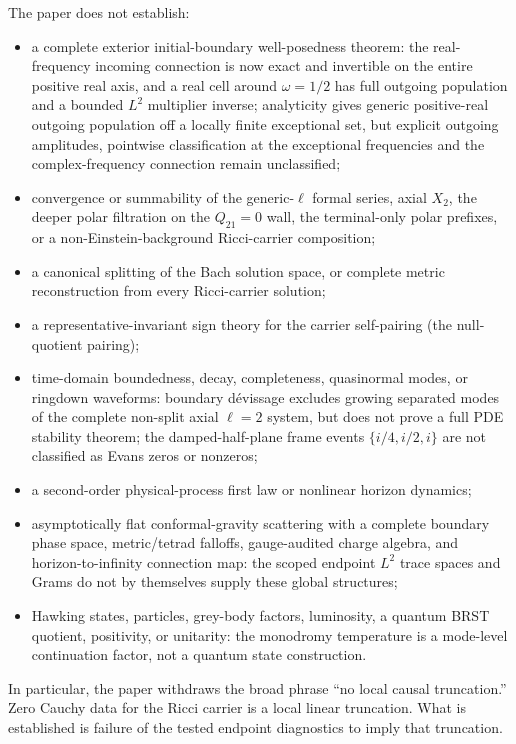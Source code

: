 \documentclass[11pt]{article}
\theoremstyle{definition}
\theoremstyle{remark}
\begin{document}
The paper does not establish:
\begin{itemize}
\item a complete exterior initial-boundary well-posedness theorem: the
      real-frequency incoming connection is now exact and invertible on the
      entire positive real axis, and a real cell around \(\omega=1/2\)
      has full outgoing population and a bounded \(L^2\) multiplier inverse;
      analyticity gives generic positive-real outgoing population off a
      locally finite exceptional set, but explicit outgoing amplitudes,
      pointwise classification at the exceptional frequencies and the
      complex-frequency connection remain unclassified;
\item convergence or summability of the generic-\(\ell\) formal series,
      axial \(X_2\), the deeper polar filtration on the \(Q_{21}=0\) wall,
      the terminal-only polar prefixes, or a non-Einstein-background
      Ricci-carrier composition;
\item a canonical splitting of the Bach solution space, or complete metric
      reconstruction from every Ricci-carrier solution;
\item a representative-invariant sign theory for the carrier self-pairing
      (the null-quotient pairing);
\item time-domain boundedness, decay, completeness, quasinormal modes, or
      ringdown waveforms: boundary d\'evissage excludes growing separated
      modes of the complete non-split axial \(\ell=2\) system, but does not
      prove a full PDE stability theorem; the damped-half-plane frame events
      \(\{i/4,i/2,i\}\) are not classified as Evans zeros or nonzeros;
\item a second-order physical-process first law or nonlinear horizon
      dynamics;
\item asymptotically flat conformal-gravity scattering with a complete
      boundary phase space, metric/tetrad falloffs, gauge-audited charge
      algebra, and horizon-to-infinity connection map: the scoped endpoint
      \(L^2\) trace spaces and Grams do not by themselves supply these global
      structures;
\item Hawking states, particles, grey-body factors, luminosity, a quantum
      BRST quotient, positivity, or unitarity: the monodromy temperature is
      a mode-level continuation factor, not a quantum state construction.
\end{itemize}
In particular, the paper withdraws the broad phrase ``no local causal
truncation.''  Zero Cauchy data for the Ricci carrier is a local linear
truncation.  What is established is failure of the tested endpoint
diagnostics to imply that truncation.
\end{document}
